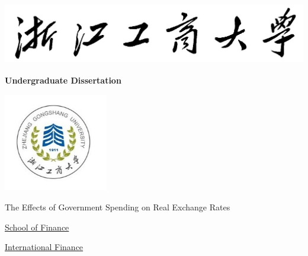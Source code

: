 \documentclass{ZJSUthesis}
\begin{document}
\begin{titlepage}
\begin{center}
\thispagestyle{empty} %
\includegraphics[height=2.72cm]{picture/ZJGU_C}

\vspace{19pt}

\yihao \textbf{Undergraduate Dissertation}

\vspace{25pt}

\includegraphics[height=4.27cm]{picture/ZJGU}
\vspace{5mm}
\end{center}
\renewcommand{\ULthickness}{0.1pt}
\ULdepth=3pt \songti\sanhao

 {The Effects of Government Spending on Real Exchange Rates}

\vspace{10mm}
%

\begin{center}

\makebox[30mm][s]{}  \uline{\hfill{School of Finance}\hfill} \makebox[30mm][s]{}
\vspace{4mm}

\makebox[30mm][s]{}  \uline{\hfill{International Finance}\hfill} \makebox[30mm][s]{}
\vspace{4mm}


\end{center}
\end{titlepage}
\end{document}
